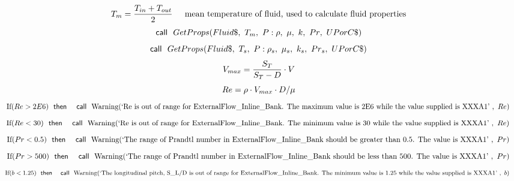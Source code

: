 \documentclass[10pt,fleqn]{article}
\newcommand{\F}[1]{\mbox{$#1$}}
\newcommand{\K}[1]{\mbox{\sf#1\ \ \mit}}
\newcommand{\KS}[1]{\mbox{\sf\ \ #1\ \ \mit}}
\newcommand{\SC}[1]{\mbox{`#1'}\  }
\newcommand{\V}[1]{\mbox{$ #1 $}}
\newcommand{\I}{\mbox{\hspace{0.20in}}}
\begin{document}
\begin{equation}
\I \label{EES Eqn:182}
T_{m}=\frac {T_{in}+T_{out}}{ 2	 } 
\mbox{\I mean temperature of fluid, used to calculate fluid properties}
\end{equation}
\begin{equation}
\I \label{EES Eqn:183}
\K{call} \F{GetProps}{ \left( Fluid\$,\ T_{m},\ P: \rho,\ \mu,\ k,\ \V{Pr} ,\ UPorC\$ \right) } 
\end{equation}
\begin{equation}
\I \label{EES Eqn:184}
\K{call} \F{GetProps}{ \left( Fluid\$,\ T_{s},\ P: \rho_{s},\ \mu_{s},\ k_{s},\ \V{Pr} _{s},\ UPorC\$ \right) } 
\end{equation}
\begin{equation}
\I \label{EES Eqn:185}
V_{max}=\frac {S_{T}}{ S_{T}-D }\cdot V 
\end{equation}
\begin{equation}
\I \label{EES Eqn:186}
\V{Re} =\rho\cdot V_{max}\cdot D/\mu 
\end{equation}
\begin{equation}
\I \label{EES Eqn:187}
\mbox{If}{ \left( \V{Re>2E6}  \right) } \KS{then} \KS{call} \mbox{Warning}{ \left( \SC{Re is out of range for ExternalFlow\_Inline\_Bank.  The maximum value is 2E6 while the value supplied is XXXA1},\ \V{Re}  \right) } 
\end{equation}
\begin{equation}
\I \label{EES Eqn:188}
\mbox{If}{ \left( \V{Re<30}  \right) } \KS{then} \KS{call} \mbox{Warning}{ \left( \SC{Re is out of range for ExternalFlow\_Inline\_Bank.  The minimum value is 30 while the value supplied is XXXA1},\ \V{Re}  \right) } 
\end{equation}
\begin{equation}
\I \label{EES Eqn:189}
\mbox{If}{ \left( \V{Pr<0.5}  \right) } \KS{then} \KS{call} \mbox{Warning}{ \left( \SC{The range of Prandtl number in ExternalFlow\_Inline\_Bank should be greater than 0.5. The value is XXXA1},\ \V{Pr}  \right) } 
\end{equation}
\begin{equation}
\I \label{EES Eqn:190}
\mbox{If}{ \left( \V{Pr>500}  \right) } \KS{then} \KS{call} \mbox{Warning}{ \left( \SC{The range of Prandtl number in ExternalFlow\_Inline\_Bank should be less than 500. The value is XXXA1},\ \V{Pr}  \right) } 
\end{equation}
\begin{equation}
\I \label{EES Eqn:191}
\mbox{If}{ \left( \V{b<1.25}  \right) } \KS{then} \KS{call} \mbox{Warning}{ \left( \SC{The longitudinal pitch, S\_L/D is out of range for ExternalFlow\_Inline\_Bank. The minimum value is 1.25 while the value supplied is XXXA1},\ b \right) } 
\end{equation}
\end{document}
